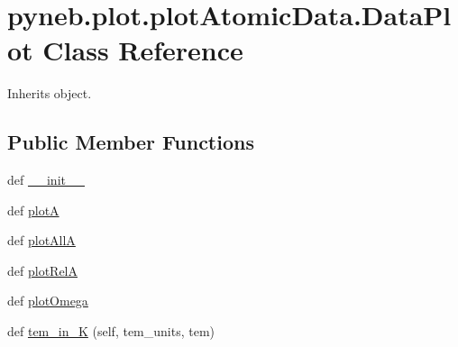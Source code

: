 \hypertarget{classpyneb_1_1plot_1_1plot_atomic_data_1_1_data_plot}{}\section{pyneb.\+plot.\+plot\+Atomic\+Data.\+Data\+Plot Class Reference}
\label{classpyneb_1_1plot_1_1plot_atomic_data_1_1_data_plot}


Inherits object.

\subsection*{Public Member Functions}
\begin{DoxyCompactItemize}
\item 
def \hyperlink{classpyneb_1_1plot_1_1plot_atomic_data_1_1_data_plot_af4b7b5510131c31e072909a6d20637c3}{\+\_\+\+\_\+init\+\_\+\+\_\+}
\item 
def \hyperlink{classpyneb_1_1plot_1_1plot_atomic_data_1_1_data_plot_a389e18b521d2052577494c8611cb5c80}{plot\+A}
\item 
def \hyperlink{classpyneb_1_1plot_1_1plot_atomic_data_1_1_data_plot_a0b245c7f8b97681b15beadcef38a0021}{plot\+All\+A}
\item 
def \hyperlink{classpyneb_1_1plot_1_1plot_atomic_data_1_1_data_plot_a9fc5e1df4de9471e26b20018ce89eb9d}{plot\+Rel\+A}
\item 
def \hyperlink{classpyneb_1_1plot_1_1plot_atomic_data_1_1_data_plot_a674c04e8512a9f5724c2af0df4e0a8fe}{plot\+Omega}
\item 
def \hyperlink{classpyneb_1_1plot_1_1plot_atomic_data_1_1_data_plot_a13bb54a69f98e9761bacb4b98f481619}{tem\+\_\+in\+\_\+\+K} (self, tem\+\_\+units, tem)
\end{DoxyCompactItemize}
